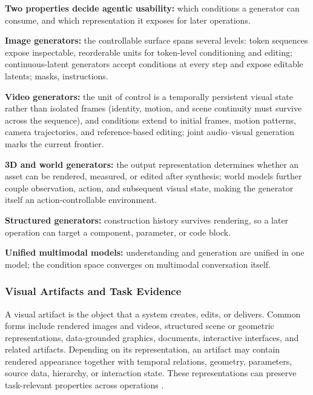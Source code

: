 \begin{keytakeaway}
\begin{keypoints}
  \item \textbf{Two properties decide agentic usability:} which conditions a generator can consume, and which representation it exposes for later operations.
  \item \textbf{Image generators:} the controllable surface spans several levels: token sequences expose inspectable, reorderable units for token-level conditioning and editing; continuous-latent generators accept conditions at every step and expose editable latents; masks, instructions.
  \item \textbf{Video generators:} the unit of control is a temporally persistent visual state rather than isolated frames (identity, motion, and scene continuity must survive across the sequence), and conditions extend to initial frames, motion patterns, camera trajectories, and reference-based editing; joint audio--visual generation marks the current frontier.
  \item \textbf{3D and world generators:} the output representation determines whether an asset can be rendered, measured, or edited after synthesis; world models further couple observation, action, and subsequent visual state, making the generator itself an action-controllable environment.
  \item \textbf{Structured generators:} construction history survives rendering, so a later operation can target a component, parameter, or code block.
  \item \textbf{Unified multimodal models:} understanding and generation are unified in one model; the condition space converges on multimodal conversation itself.
\end{keypoints}
\end{keytakeaway}


\subsubsection{Visual Artifacts and Task Evidence}

A visual artifact is the object that a system creates, edits, or delivers. Common forms include rendered images and videos, structured scene or geometric representations, data-grounded graphics, documents, interactive interfaces, and related artifacts. Depending on its representation, an artifact may contain rendered appearance together with temporal relations, geometry, parameters, source data, hierarchy, or interaction state. These representations can preserve task-relevant properties across operations \cite{yin2025spatiotemporal,mildenhall2020nerf,wu2021deepcad,dibia2018data2vis,beltramelli2017pix2code}.

